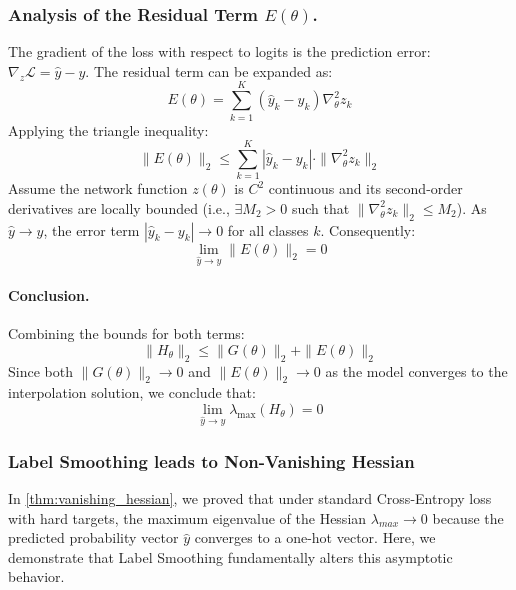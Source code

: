 \documentclass{article}
\theoremstyle{plain}
\theoremstyle{definition}
\theoremstyle{remark}
\begin{document}
\subsubsection{Analysis of the Residual Term $E(\theta)$.}
The gradient of the loss with respect to logits is the prediction error: $\nabla_z \mathcal{L} = \hat{y} - y$. The residual term can be expanded as:
\begin{equation}
    E(\theta) = \sum_{k=1}^K (\hat{y}_k - y_k) \nabla^2_\theta z_k
\end{equation}
Applying the triangle inequality:
\begin{equation}
    \|E(\theta)\|_2 \leq \sum_{k=1}^K |\hat{y}_k - y_k| \cdot \|\nabla^2_\theta z_k\|_2
\end{equation}
Assume the network function $z(\theta)$ is $C^2$ continuous and its second-order derivatives are locally bounded (i.e., $\exists M_2 > 0$ such that $\|\nabla^2_\theta z_k\|_2 \leq M_2$). As $\hat{y} \to y$, the error term $|\hat{y}_k - y_k| \to 0$ for all classes $k$. Consequently:
\begin{equation}
    \lim_{\hat{y} \to y} \|E(\theta)\|_2 = 0
\end{equation}

\paragraph{Conclusion.}
Combining the bounds for both terms:
\begin{equation}
    \|H_\theta\|_2 \leq \|G(\theta)\|_2 + \|E(\theta)\|_2
\end{equation}
Since both $\|G(\theta)\|_2 \to 0$ and $\|E(\theta)\|_2 \to 0$ as the model converges to the interpolation solution, we conclude that:
\begin{equation}
    \lim_{\hat{y} \to y} \lambda_{\max}(H_\theta) = 0
\end{equation}

\subsubsection{Label Smoothing leads to Non-Vanishing Hessian}
\label{app:ls}
In \cref{thm:vanishing_hessian}, we proved that under standard Cross-Entropy loss with hard targets, 
the maximum eigenvalue of the Hessian $\lambda_{max} \to 0$ 
because the predicted probability vector $\hat{y}$ converges to a one-hot vector. 
Here, we demonstrate that Label Smoothing fundamentally alters this asymptotic behavior.
\end{document}
